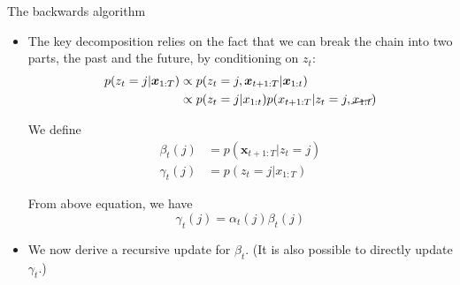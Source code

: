 \documentclass[10pt,mathserif]{beamer}
\begin{document}
\begin{frame}{The backwards algorithm}
\begin{itemize}
    \item The key decomposition relies on the fact that we can break the chain into two parts, the past and the future, by conditioning on $z_t$:
    \begin{equation*}
        \begin{split}
            p(z_t = j|\bm{x}_{1:T}) &  \propto  p(z_t = j,\bm{x}_{t+1:T}|\bm{x}_{1:t})\\
            & \propto  p(z_t = j|x_{1:t})p(x_{t+1:T}|z_t = j, \cancel{x_{1:t}})
        \end{split}
    \end{equation*}
    
    We define
    \begin{equation*}
        \begin{split}
            \beta_t(j) & = p(\bm{x}_{t+1:T}|z_t =j) \\
            \gamma_t(j) & = p(z_t = j|x_{1:T})
        \end{split}
    \end{equation*}
    
    From above equation, we have
    \begin{equation*}
         \gamma_t(j) = \alpha_t(j)\beta_t(j)
    \end{equation*}
    
    \item We now derive a recursive update for $\beta_t$. (It is also possible to directly update $\gamma_t$.)
\end{itemize}
\end{frame}
\end{document}
